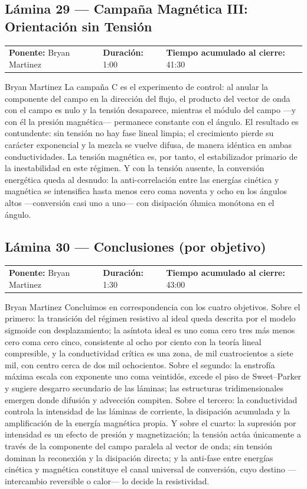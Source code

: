 \documentclass[11pt,letterpaper]{article}
\makeatletter
\newcommand{\lamina}[5]{%
  \subsection*{Lámina #1 --- #2}
  \noindent
  \begin{tabular}{@{}llll@{}}
    \textbf{Ponente:} #3 &\quad \textbf{Duración:} #4 &\quad
    \textbf{Tiempo acumulado al cierre:} #5 &
  \end{tabular}
  \vspace{2pt}}
\makeatother
\begin{document}
\lamina{29}{Campaña Magnética III: Orientación sin Tensión}{Bryan Martinez}{1:00}{41:30}

\begin{parlamento}{Bryan Martinez}
La campaña C es el experimento de control: al anular la componente del
campo en la dirección del flujo, el producto del vector de onda con el
campo es nulo y la tensión desaparece, mientras el módulo del campo ---y
con él la presión magnética--- permanece constante con el ángulo. El
resultado es contundente: sin tensión no hay fase lineal limpia; el
crecimiento pierde su carácter exponencial y la mezcla se vuelve difusa,
de manera idéntica en ambas conductividades. La tensión magnética es, por
tanto, el estabilizador primario de la inestabilidad en este régimen. Y
con la tensión ausente, la conversión energética queda al desnudo: la
anti-correlación entre las energías cinética y magnética se intensifica
hasta menos cero coma noventa y ocho en los ángulos altos ---conversión
casi uno a uno--- con disipación óhmica monótona en el ángulo.
\end{parlamento}

\lamina{30}{Conclusiones (por objetivo)}{Bryan Martinez}{1:30}{43:00}

\begin{parlamento}{Bryan Martinez}
Concluimos en correspondencia con los cuatro objetivos. Sobre el primero:
la transición del régimen resistivo al ideal queda descrita por el modelo
sigmoide con desplazamiento; la asíntota ideal es uno coma cero tres más
menos cero coma cero cinco, consistente al ocho por ciento con la teoría
lineal compresible, y la conductividad crítica es una zona, de mil
cuatrocientos a siete mil, con centro cerca de dos mil ochocientos.
Sobre el segundo: la enstrofía máxima escala con exponente uno coma
veintidós, excede el piso de Sweet--Parker y sugiere desgarro secundario
de las láminas; las estructuras tridimensionales emergen donde difusión y
advección compiten. Sobre el tercero: la conductividad controla la
intensidad de las láminas de corriente, la disipación acumulada y la
amplificación de la energía magnética propia. Y sobre el cuarto: la
supresión por intensidad es un efecto de presión y magnetización; la
tensión actúa únicamente a través de la componente del campo paralela al
vector de onda; sin tensión dominan la reconexión y la disipación
directa; y la anti-fase entre energías cinética y magnética constituye el
canal universal de conversión, cuyo destino ---intercambio reversible o
calor--- lo decide la resistividad.
\end{parlamento}
\end{document}
